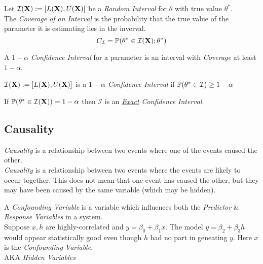 \documentclass[11pt,a4paper]{article}
\begin{document}
Let $\mathcal{I}(\textbf{X}):=[L(\textbf{X}),U(\textbf{X})]$ be a \textit{Random Interval} for $\theta$ with true value $\theta^*$.\\
The \textit{Coverage of an Interval} is the probability that the true value of the parameter it is estimating lies in the inverval.
$$C_\mathcal{I}=\mathbb{P}(\theta^*\in\mathcal{I}(\textbf{X});\theta^*)$$

A $1-\alpha$ \textit{Confidence Interval} for a parameter is an interval with \textit{Coverage} at least $1-\alpha$.
\begin{center}
$\mathcal{I}(\textbf{X}):=[L(\textbf{X}),U(\textbf{X})]$ is a $1-\alpha$ \textit{Confidence Interval} if $\mathbb{P}(\theta^*\in\mathcal{I})\geq1-\alpha$
\end{center}
\nb If $\mathbb{P}(\theta^*\in\mathcal{I}(\textbf{X}))=1-\alpha$ then $\mathcal{I}$ is an \textit{\underline{Exact} Confidence Interval}.\\




\subsection{Causality}

\textit{Causality} is a relationship between two events where one of the events caused the other.\\

\textit{Causality} is a relationship between two events where the events are likely to occur together. This does not mean that one event has caused the other, but they may have been caused by the same variable (which may be hidden).\\

 
A \textit{Confounding Variable} is a variable which influences both the \textit{Predictor} \& \textit{Response Variables} in a system.\\
Suppose $x,h$ are highly-correlated and $y=\beta_0+\beta_1x$. The model $y=\beta_2+\beta_3h$ would appear statistically good even though $h$ had no part in geneating $y$. Here $x$ is the \textit{Confounding Variable}.\\
\nb AKA \textit{Hidden Variables}
\end{document}
